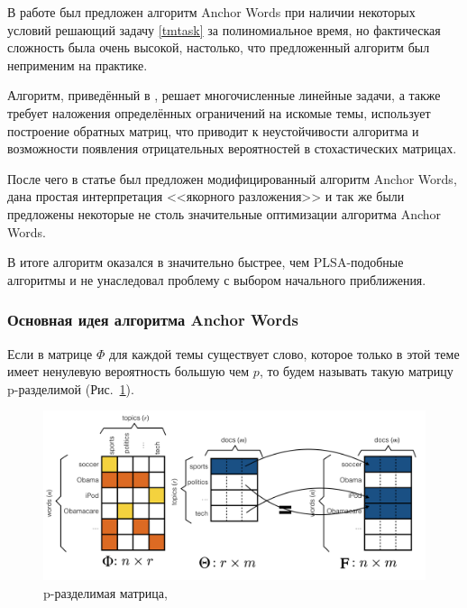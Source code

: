 \documentclass[a4paper, 14pt]{extarticle}
\begin{document}
В работе \cite{Arora12} был предложен алгоритм Anchor Words при наличии некоторых условий решающий задачу \ref{tmtask} за полиномиальное время, но фактическая сложность была очень высокой, настолько, что предложенный алгоритм был неприменим на практике. 

Алгоритм, приведённый в \cite{Arora12}, решает многочисленные линейные задачи, а также требует наложения определённых ограничений на искомые темы, использует построение обратных матриц, что приводит к неустойчивости алгоритма и возможности появления отрицательных вероятностей в  стохастических матрицах.

После чего в статье \cite{Arora12b} был предложен модифицированный алгоритм Anchor Words, дана простая интерпретация <<якорного разложения>> и так же были предложены некоторые не столь значительные оптимизации алгоритма Anchor Words.

В итоге алгоритм оказался в значительно быстрее, чем PLSA-подобные алгоритмы и не унаследовал проблему с выбором начального приближения.

\subsubsection*{Основная идея алгоритма Anchor Words}
Если в матрице $\Phi$ для каждой темы существует слово, которое только в этой теме имеет ненулевую вероятность большую чем $p$, то будем называть такую матрицу p-разделимой (Рис.~\ref{psep}).  

	\begin{figure}
			\centering \includegraphics[scale=0.25]{img/psep} 
			\caption{p-разделимая матрица, \cite{CatalinVoss14}}
			\label{psep}
	\end{figure}
\end{document}
